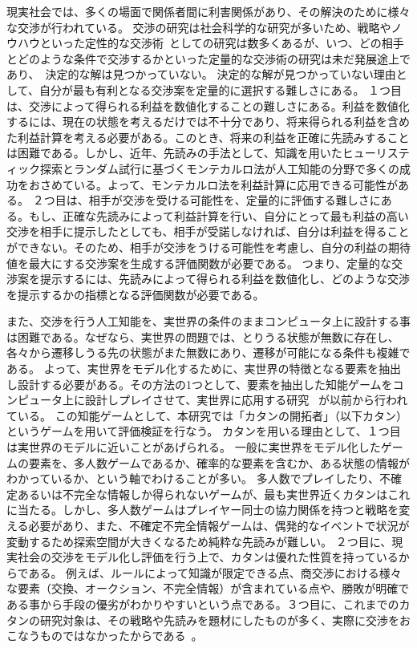\documentclass[a4, 10pt,dvipdfmx]{jsarticle}
\begin{document}
現実社会では、多くの場面で関係者間に利害関係があり、その解決のために様々な交渉が行われている。
交渉の研究は社会科学的な研究が多いため、戦略やノウハウといった定性的な交渉術~\cite{fisher2011,lewicki2001essentials,岡紀子2002視点}としての研究は数多くあるが、いつ、どの相手とどのような条件で交渉するかといった定量的な交渉術の研究は未だ発展途上であり、~\cite{安村禎明2002モノポリーゲームにおける交渉エージェント}決定的な解は見つかっていない。
決定的な解が見つかっていない理由として、自分が最も有利となる交渉案を定量的に選択する難しさにある。
１つ目は、交渉によって得られる利益を数値化することの難しさにある。利益を数値化するには、現在の状態を考えるだけでは不十分であり、将来得られる利益を含めた利益計算を考える必要がある。このとき、将来の利益を正確に先読みすることは困難である。しかし、近年、先読みの手法として、知識を用いたヒューリスティック探索とランダム試行に基づくモンテカルロ法が人工知能の分野で多くの成功をおさめている。よって、モンテカルロ法を利益計算に応用できる可能性がある。
２つ目は、相手が交渉を受ける可能性を、定量的に評価する難しさにある。もし、正確な先読みによって利益計算を行い、自分にとって最も利益の高い交渉を相手に提示したとしても、相手が受諾しなければ、自分は利益を得ることができない。そのため、相手が交渉をうける可能性を考慮し、自分の利益の期待値を最大にする交渉案を生成する評価関数が必要である。
つまり、定量的な交渉案を提示するには、先読みによって得られる利益を数値化し、どのような交渉を提示するかの指標となる評価関数が必要である。

また、交渉を行う人工知能を、実世界の条件のままコンピュータ上に設計する事は困難である。なぜなら、実世界の問題では、とりうる状態が無数に存在し、各々から遷移しうる先の状態がまた無数にあり、遷移が可能になる条件も複雑である。
よって、実世界をモデル化するために、実世界の特徴となる要素を抽出し設計する必要がある。その方法の1つとして、要素を抽出した知能ゲームをコンピュータ上に設計しプレイさせて、実世界に応用する研究 ~\cite{川越敏司2010行動ゲーム理論入門}が以前から行われている。
この知能ゲームとして、本研究では「カタンの開拓者」（以下カタン）というゲームを用いて評価検証を行なう。
カタンを用いる理由として、１つ目は実世界のモデルに近いことがあげられる。
一般に実世界をモデル化したゲームの要素を、多人数ゲームであるか、確率的な要素を含むか、ある状態の情報がわかっているか、という軸でわけることが多い。
多人数でプレイしたり、不確定あるいは不完全な情報しか得られないゲームが、最も実世界近くカタンはこれに当たる。しかし、多人数ゲームはプレイヤー同士の協力関係を持つと戦略を変える必要があり、また、不確定不完全情報ゲームは、偶発的なイベントで状況が変動するため探索空間が大きくなるため純粋な先読みが難しい。
２つ目に、現実社会の交渉をモデル化し評価を行う上で、カタンは優れた性質を持っているからである。
例えば、ルールによって知識が限定できる点、商交渉における様々な要素（交換、オークション、不完全情報）が含まれている点や、勝敗が明確である事から手段の優劣がわかりやすいという点である。３つ目に、これまでのカタンの研究対象は、その戦略や先読みを題材にしたものが多く、実際に交渉をおこなうものではなかったからである~\cite{kocsis2006bandit,schadd2009monte}。
\end{document}
